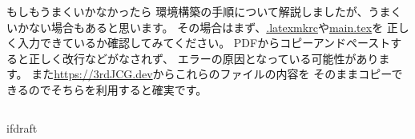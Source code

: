 			\begin{column}{もしもうまくいかなかったら}
				環境構築の手順について解説しましたが、うまくいかない場合もあると思います。
				その場合はまず、\url{.latexmkrc}や\url{main.tex}を
				正しく入力できているか確認してみてください。
				PDFからコピーアンドペーストすると正しく改行などがなされず、
				エラーの原因となっている可能性があります。
				また\url{https://3rdJCG.dev}からこれらのファイルの内容を
				そのままコピーできるのでそちらを利用すると確実です。
			\end{column}

\expandafter\ifx\csname ifdraft\endcsname\relax
	
\fi